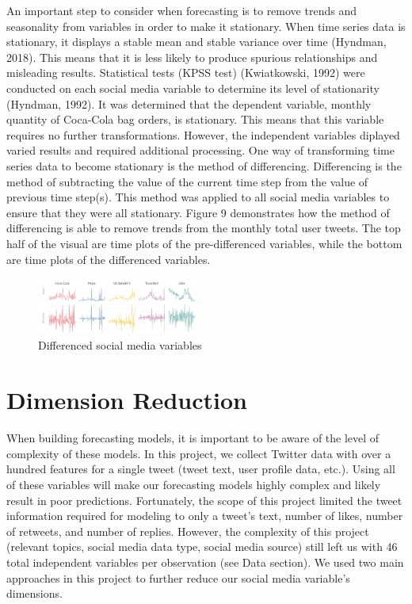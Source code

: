 \documentclass[12pt,oneside]{chicagocapstone}
\begin{document}
An important step to consider when forecasting is to remove trends and seasonality from variables in order to make it stationary. When time series data is stationary, it displays a stable mean and stable variance over time (Hyndman, 2018). This means that it is less likely to produce spurious relationships and misleading results. Statistical tests (KPSS test) (Kwiatkowski, 1992) were conducted on each social media variable to determine its level of stationarity (Hyndman, 1992). It was determined that the dependent variable, monthly quantity of Coca-Cola bag orders, is stationary. This means that this variable requires no further transformations. However, the independent variables diplayed varied results and required additional processing. One way of transforming time series data to become stationary is the method of differencing. Differencing is the method of subtracting the value of the current time step from the value of previous time step(s). This method was applied to all social media variables to ensure that they were all stationary. Figure 9 demonstrates how the method of differencing is able to remove trends from the monthly total user tweets. The top half of the visual are time plots of the pre-differenced variables, while the bottom are time plots of the differenced variables.
\begin{figure}

{\centering \includegraphics[width=200px,angle = 0, scale=2.1]{figure/differencing} 

}

\caption{Differenced social media variables}\label{fig:differencing}
\end{figure}
\hypertarget{dimension-reduction}{%
\section*{Dimension Reduction}\label{dimension-reduction}}

When building forecasting models, it is important to be aware of the level of complexity of these models. In this project, we collect Twitter data with over a hundred features for a single tweet (tweet text, user profile data, etc.). Using all of these variables will make our forecasting models highly complex and likely result in poor predictions. Fortunately, the scope of this project limited the tweet information required for modeling to only a tweet's text, number of likes, number of retweets, and number of replies. However, the complexity of this project (relevant topics, social media data type, social media source) still left us with 46 total independent variables per observation (see Data section). We used two main approaches in this project to further reduce our social media variable's dimensions.
\end{document}
